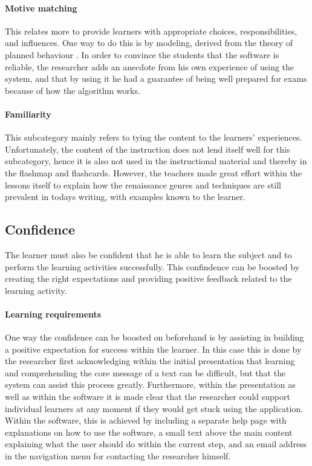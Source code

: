 \paragraph{Motive matching} This relates more to provide learners with appropriate choices, responsibilities, and influences. One way to do this is by modeling, derived from the theory of planned behaviour \cite{theoryplannedbehaviour}. In order to convince the students that the software is reliable, the researcher adds an anecdote from his own experience of using the system, and that by using it he had a guarantee of being well prepared for exams because of how the algorithm works.

\paragraph{Familiarity} This subcategory mainly refers to tying the content to the learners' experiences. Unfortunately, the content of the instruction does not lend itself well for this subcategory, hence it is also not used in the instructional material and thereby in the flashmap and flashcards. However, the teachers made great effort within the lessons itself to explain how the renaissance genres and techniques are still prevalent in todays writing, with examples known to the learner.

        \subsection{Confidence}

The learner must also be confident that he is able to learn the subject and to perform the learning activities successfully. This confindence can be boosted by creating the right expectations and providing positive feedback related to the learning activity.
        
\paragraph{Learning requirements} One way the confidence can be boosted on beforehand is by assisting in building a positive expectation for success within the learner. In this case this is done by the researcher first acknowledging within the initial presentation that learning and comprehending the core message of a text can be difficult, but that the system can assist this process greatly. Furthermore, within the presentation as well as within the software it is made clear that the researcher could support individual learners at any moment if they would get stuck using the application. Within the software, this is achieved by including a separate help page with explanations on how to use the software, a small text above the main content explaining what the user should do within the current step, and an email address in the navigation menu for contacting the researcher himself.

